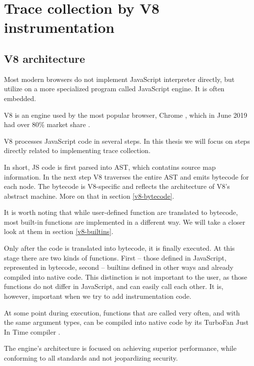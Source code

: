 \chapter{Trace collection by V8 instrumentation}
\label{v8-instrumentation}

\section{V8 architecture}
Most modern browsers do not implement JavaScript interpreter directly, but utilize on a more
specialized program called JavaScript engine. It is often embedded.

V8 is an engine used by the most popular browser, Chrome \cite{v8:main-page}, which in June 2019 
had over 80\% market share  \cite{w3:browsers}.


V8 processes JavaScript code in several steps. In this thesis we will focus on steps
directly related to implementing trace collection.

In short, JS code is first parsed into AST, which contatins source map information. 
In the next step V8 traverses the entire AST and emits bytecode for each node.
The bytecode is V8-specific and reflects the architecture of V8's abstract machine.
More on that in section \ref{v8-bytecode}.

It is worth noting that while user-defined function are translated to bytecode,
most built-in functions are implemented in a different way. We will take a closer look at them
in section \ref{v8-builtins}.

Only after the code is translated into bytecode, it is finally executed. At this stage there are two
kinds of functions. First -- those defined in JavaScript, represented in bytecode, second -- builtins
defined in other ways and already compiled into native code. This distinction is not important 
to the user, as those functions do not differ in JavaScript, and can easily call each other.
It is, however, important when we try to add instrumentation code.

At some point during execution, functions that are called very often, and with the same argument types, can
be compiled into native code by its TurboFan Just In Time compiler \cite{v8:turbofan-jit}.

The engine's architecture is focused on achieving superior performance, while conforming to all
standards and not jeopardizing security. 

